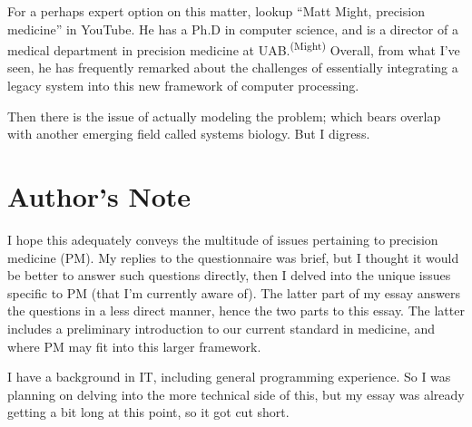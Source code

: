 For a perhaps expert option on this matter, lookup ``Matt Might, precision medicine'' in YouTube. He has a Ph.D in computer science, and is a director of a medical department in precision medicine at UAB.\textsuperscript{(Might)} Overall, from what I've seen, he has frequently remarked about the challenges of essentially integrating a legacy system into this new framework of computer processing.


Then there is the issue of actually modeling the problem; which bears overlap with another emerging field called systems biology. But I digress.


\section*{Author's Note}

I hope this adequately conveys the multitude of issues pertaining to precision medicine (PM). My replies to the questionnaire was brief, but I thought it would be better to answer such questions directly, then I delved into the unique issues specific to PM (that I'm currently aware of). The latter part of my essay answers the questions in a less direct manner, hence the two parts to this essay. The latter includes a preliminary introduction to our current standard in medicine, and where PM may fit into this larger framework.

I have a background in IT, including general programming experience. So I was planning on delving into the more technical side of this, but my essay was already getting a bit long at this point, so it got cut short. 




